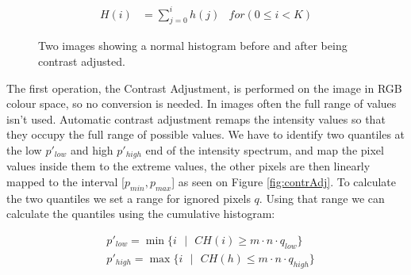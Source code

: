 \documentclass[journal,transmag]{IEEEtran}
\begin{document}
\begin{equation}%
\begin{aligned}
H(i) &=  \sum_{j = 0}^{i}h(j) 
& for(0 \leq i < K)
\end{aligned}
\end{equation}
\begin{figure}[t] %
	\centering
	\caption{Two images showing a normal histogram before and after being contrast adjusted.}
	\label{fig:contrAdjustedHist}
\end{figure}

The first operation, the Contrast Adjustment, is performed on the image in RGB colour space, so no conversion is needed. In images often the full range of values isn't used. Automatic contrast adjustment remaps the intensity values so that they occupy the full range of possible values\cite{automaticContrast}. We have to identify two quantiles at the low $p'_{low}$ and high $p'_{high}$ end of the intensity spectrum, and map the pixel values inside them to the extreme values, the other pixels are then linearly mapped to the interval [$p_{min}, p_{max}$] as seen on Figure \ref{fig:contrAdj}. To calculate the two quantiles we set a range for ignored pixels $q$. Using that range we can calculate the quantiles using the cumulative histogram:

\begin{equation} %
\begin{aligned}\label{eq:contrAdjPlowNPhigh}
&p'_{low} = \min\{i \text{ } | \text{ } CH(i) \geq m\cdot n \cdot q_{low}\}\\
&p'_{high} = \max\{i \text{ } | \text{ } CH(h) \leq m\cdot n \cdot q_{high}\}
\end{aligned}
\end{equation}
\end{document}
